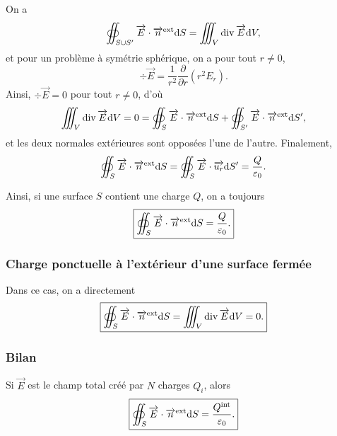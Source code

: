             On a 
            \begin{equation*}
                \oiint_{S\cup S'}\protect\overrightarrow{{E}}\cdot\protect\overrightarrow{{n}}^{\text{ext}}\mathrm{d} S=\iiint_{V}\operatorname{div}\protect\overrightarrow{{E}}\mathrm{d} V,
            \end{equation*}
            et pour un problème à symétrie sphérique, on a pour tout $r\neq0$,
            \begin{equation*}
                \div\vec{E}=\frac{1}{r^{2}}\frac{\partial}{\partial r}\left(r^{2}E_r\right).
            \end{equation*}
            Ainsi, $\div\vec{E}=0$ pour tout $r\neq 0$, d'où 
            \begin{equation*}
                \iiint_{V}\operatorname{div}\protect\overrightarrow{{E}}\mathrm{d} V=0=\oiint_{S}\protect\overrightarrow{{E}}\cdot\protect\overrightarrow{{n}}^{\text{ext}}\mathrm{d} S+\oiint_{S'}\protect\overrightarrow{{E}}\cdot\protect\overrightarrow{{n}}^{\text{ext}}\mathrm{d} S',
            \end{equation*}
            et les deux normales extérieures sont opposées l'une de l'autre. Finalement,
            \begin{equation*}
                \oiint_{S}\protect\overrightarrow{{E}}\cdot\protect\overrightarrow{{n}}^{\text{ext}}\mathrm{d} S=\oiint_{S}\protect\overrightarrow{{E}}\cdot\protect\overrightarrow{{u_r}}\mathrm{d} S'=\frac{Q}{\varepsilon_{0}}.
            \end{equation*}

            Ainsi, si une surface $S$ contient une charge $Q$, on a toujours
            \begin{equation*}
                \boxed{
                    \oiint_{S}\protect\overrightarrow{{E}}\cdot\protect\overrightarrow{{n}}^{\text{ext}}\mathrm{d} S=\frac{Q}{\varepsilon_{0}}.
                }
            \end{equation*}

        \subsubsection{Charge ponctuelle à l'extérieur d'une surface fermée}

            Dans ce cas, on a directement
            \begin{equation*}
                \boxed{
                    \oiint_{S}\protect\overrightarrow{{E}}\cdot\protect\overrightarrow{{n}}^{\text{ext}}\mathrm{d} S=\iiint_{V}\operatorname{div}\protect\overrightarrow{{E}}\mathrm{d} V=0.
                }
            \end{equation*}

        \subsubsection{Bilan}

            Si $\vec{E}$ est le champ total créé par $N$ charges $Q_i$, alors
            \begin{equation*}
                \boxed{
                    \oiint_{S}\protect\overrightarrow{{E}}\cdot\protect\overrightarrow{{n}}^{\text{ext}}\mathrm{d} S=\frac{Q^{\text{int}}}{\varepsilon_{0}}.
                }
            \end{equation*}

